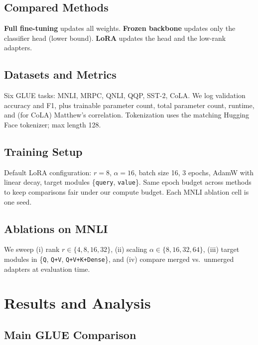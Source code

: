 \documentclass[11pt]{article}
\begin{document}
\subsection{Compared Methods}
\textbf{Full fine-tuning} updates all weights. \textbf{Frozen backbone} updates only the classifier head (lower bound). \textbf{LoRA} updates the head and the low-rank adapters.

\subsection{Datasets and Metrics}
Six GLUE \cite{wang2018glue} tasks: MNLI, MRPC, QNLI, QQP, SST-2, CoLA. We log validation accuracy and F1, plus trainable parameter count, total parameter count, runtime, and (for CoLA) Matthew's correlation. Tokenization uses the matching Hugging Face tokenizer; max length 128.

\subsection{Training Setup}
Default LoRA configuration: $r{=}8$, $\alpha{=}16$, batch size 16, 3 epochs, AdamW with linear decay, target modules \{\texttt{query}, \texttt{value}\}. Same epoch budget across methods to keep comparisons fair under our compute budget. Each MNLI ablation cell is one seed.

\subsection{Ablations on MNLI}
We sweep (i) rank $r \in \{4,8,16,32\}$, (ii) scaling $\alpha \in \{8,16,32,64\}$, (iii) target modules in \{\texttt{Q}, \texttt{Q+V}, \texttt{Q+V+K+Dense}\}, and (iv) compare merged vs.\ unmerged adapters at evaluation time.

\section{Results and Analysis}

\subsection{Main GLUE Comparison}
\end{document}
